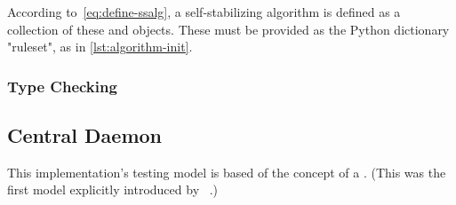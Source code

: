 According to~\eqref{eq:define-ssalg},
  a self-stabilizing algorithm is defined as a collection
  of these  and  objects.
These must be provided as the Python dictionary "ruleset",
  as in \autoref{lst:algorithm-init}.


\subsubsection{Type Checking}
\label{sec:logic-repr:self-stab-algor:type-checking}



\subsection{Central Daemon}
\label{sec:logic-repr:daemon}

This implementation's testing model is based of the concept of a .
(This was the first model explicitly introduced
  by \citeauthor{Dijkstra:1974:SSS:361179.361202}~\autocite{Dijkstra:1974:SSS:361179.361202}.)

